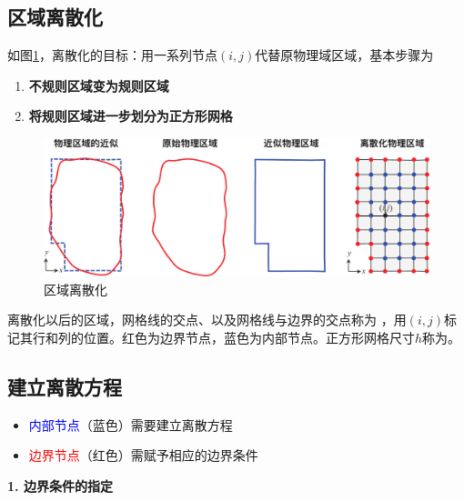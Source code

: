 \subsection{区域离散化}
如图\ref{区域离散化}，离散化的目标：用一系列节点$(i,j)$代替原物理域区域，基本步骤为
\vspace*{-0.5em}
\begin{enumerate}
	\item \textbf{不规则区域变为规则区域}\vspace*{-0.5em}
	\item \textbf{将规则区域进一步划分为正方形网格}
\end{enumerate}
\begin{figure}[!htb]
	\centering
	\includegraphics[width=0.85\linewidth]{pic/空间离散化.pdf}
	\caption{区域离散化}
	\label{区域离散化}
\end{figure}
	
离散化以后的区域，网格线的交点、以及网格线与边界的交点称为 ，用$( i,j)$标记其行和列的位置。红色为边界节点，蓝色为内部节点。正方形网格尺寸$h$称为。
\vspace*{0.5em}
	
\subsection{建立离散方程}
\begin{itemize}
	\item \textcolor{blue}{内部节点}（蓝色）需要建立离散方程\vspace*{-0.5em}
	\item \textcolor{red}{边界节点}（红色）需赋予相应的边界条件
\end{itemize}
\noindent \textbf{1. 边界条件的指定}

